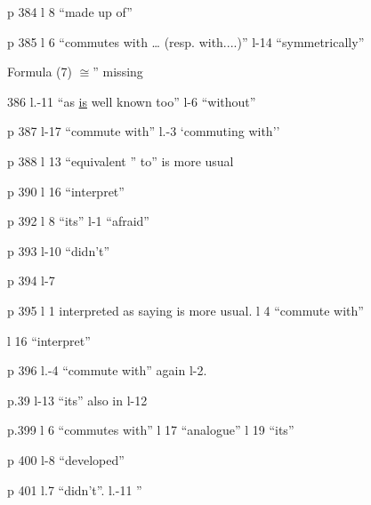 p 384 l 8 ``made up of''

p 385 l 6 ``commutes with \ldots{} (resp. with....)'' \quad l-14 ``symmetrically''

Formula (7) $\cong$'' missing

386 l.-11 ``as \uline{is} well known too'' \quad l-6 ``without''

p 387 l-17 ``commute with'' \quad l.-3 `commuting with''

p 388 l 13 ``equivalent '' to'' is more usual

p 390 l 16 ``interpret''

p 392 l 8 ``its'' \quad l-1 ``afraid''

p 393 l-10 ``didn't''

p 394 l-7 

p 395 l 1 interpreted as saying is more usual. \quad l 4 ``commute with''

l 16 ``interpret''

p 396 l.-4 ``commute with'' again l-2. 

p.39 l-13 ``its'' also in l-12

p.399 l 6 ``commutes with'' \quad l 17 ``analogue'' \quad l 19 ``its''

p 400 l-8 ``developed''

p 401 l.7 ``didn't''. \quad l.-11 ''

